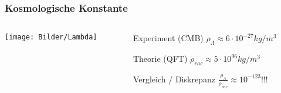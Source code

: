 \documentclass{beamer}
\begin{document}
\begin{frame}\frametitle{Kosmologische Konstante}

\begin{columns}

\begin{column}{.48\textwidth}

\texttt{[image: Bilder/Lambda]}

\end{column}

\hfill

\begin{column}{.48\textwidth}

\begin{block}{Experiment (CMB)}
$\rho_{\Lambda} \approx 6 \cdot 10^{-27} kg/m^3$
\end{block}

\begin{block}{Theorie (QFT)}
$\rho_{vac} \approx 5 \cdot 10^{96} kg/m^3$
\end{block}

\begin{block}{Vergleich / Diskrepanz}
$\frac{\rho_{\Lambda}}{\rho_{vac}} \approx 10^{-123}$!!!
\end{block}

\end{column}

\end{columns}

\end{frame}
\end{document}
